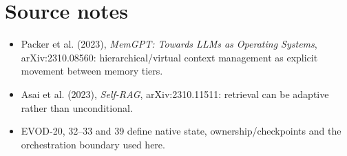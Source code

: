 \chapter*{Source notes}
\begin{itemize}
\item Packer et al. (2023), \emph{MemGPT: Towards LLMs as Operating Systems}, arXiv:2310.08560: hierarchical/virtual context management as explicit movement between memory tiers.
\item Asai et al. (2023), \emph{Self-RAG}, arXiv:2310.11511: retrieval can be adaptive rather than unconditional.
\item EVOD-20, 32--33 and 39 define native state, ownership/checkpoints and the orchestration boundary used here.
\end{itemize}
